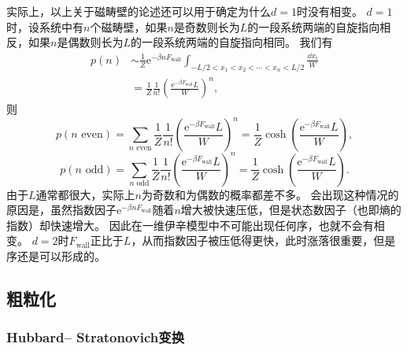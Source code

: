 \documentclass[hyperref, UTF8, a4paper]{ctexart}
\newcommand*{\ee}{\mathrm{e}}
\begin{document}
实际上，以上关于磁畴壁的论述还可以用于确定为什么$d=1$时没有相变。
$d=1$时，设系统中有$n$个磁畴壁，如果$n$是奇数则长为$L$的一段系统两端的自旋指向相反，如果$n$是偶数则长为$L$的一段系统两端的自旋指向相同。
我们有
\[
    \begin{aligned}
        p(n) &\sim \frac{1}{Z} \ee^{-\beta n F_\text{wall}} \int_{-L/2<x_1<x_2<\cdots<x_n<L/2} \frac{\dd{x_i}}{W} \\
        &= \frac{1}{Z} \frac{1}{n!} \left( \frac{\ee^{-\beta F_\text{wall}} L}{W} \right)^n,
    \end{aligned}
\]
则
\[
    p(\text{$n$ even}) = \sum_{\text{$n$ even}} \frac{1}{Z} \frac{1}{n!} \left( \frac{\ee^{-\beta F_\text{wall}} L}{W} \right)^n = \frac{1}{Z} \cosh(\frac{\ee^{-\beta F_\text{wall}} L}{W}),
\]
\[
    p(\text{$n$ odd}) = \sum_{\text{$n$ odd}} \frac{1}{Z} \frac{1}{n!} \left( \frac{\ee^{-\beta F_\text{wall}} L}{W} \right)^n = \frac{1}{Z} \cosh(\frac{\ee^{-\beta F_\text{wall}} L}{W}).
\]
由于$L$通常都很大，实际上$n$为奇数和为偶数的概率都差不多。
会出现这种情况的原因是，虽然指数因子$\ee^{-\beta n F_\text{wall}}$随着$n$增大被快速压低，但是状态数因子（也即熵的指数）却快速增大。
因此在一维伊辛模型中不可能出现任何序，也就不会有相变。
$d=2$时$F_\text{wall}$正比于$L$，从而指数因子被压低得更快，此时涨落很重要，但是序还是可以形成的。

\subsection{粗粒化}\label{sec:ab-initio-effective-theory}

\subsubsection{Hubbard–
Stratonovich变换}
\end{document}

